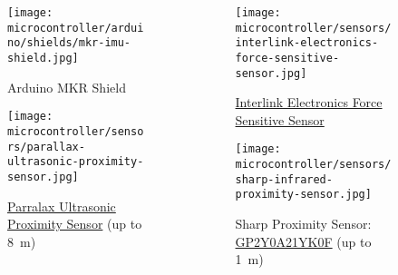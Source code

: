 \begin{frame}
    \begin{columns}
        \begin{column}{0.5\textwidth}
            \begin{figure}
                \texttt{[image: microcontroller/arduino/shields/mkr-imu-shield.jpg]}
                \caption{Arduino\textregistered{} MKR  Shield}
            \end{figure}
            \begin{figure}
                \texttt{[image: microcontroller/sensors/parallax-ultrasonic-proximity-sensor.jpg]}
                \caption{\href{https://www.parallax.com/product/ping-ultrasonic-distance-sensor/}{Parralax Ultrasonic Proximity Sensor} (up to \SI{8}{\meter})}
            \end{figure}
        \end{column}
        \begin{column}{0.5\textwidth}
            \begin{figure}
                \texttt{[image: microcontroller/sensors/interlink-electronics-force-sensitive-sensor.jpg]}
                \caption{\href{https://cdn.sparkfun.com/assets/8/a/1/2/0/2010-10-26-DataSheet-FSR402-Layout2.pdf}{Interlink Electronics Force Sensitive Sensor}}
            \end{figure}
            \begin{figure}
                \texttt{[image: microcontroller/sensors/sharp-infrared-proximity-sensor.jpg]}
                \caption{Sharp  Proximity Sensor: \href{https://global.sharp/products/device/lineup/data/pdf/datasheet/gp2y0a21yk\_e.pdf}{GP2Y0A21YK0F} (up to \SI{1}{\meter})}
            \end{figure}
        \end{column}
    \end{columns}
\end{frame}